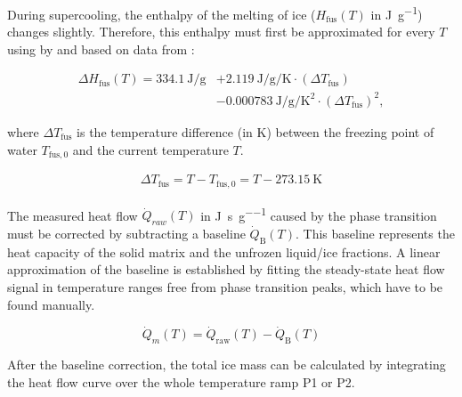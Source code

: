 
During supercooling, the enthalpy of the melting of ice ($H_\text{fus}(T)$ in \unit{\joule\per\gram}) changes slightly.
Therefore, this enthalpy must first be approximated for every $T$ using  by \textcite{chen.1988} and \textcite{ishikiriyama.1995} based on data from \textcite{randall.1930}:

\begin{equation}
	\begin{aligned}
		\Delta H_\text{fus}(T) = \qty{334.1}{\joule\per\gram} & + \qty{2.119}{\joule\per\gram\per\kelvin} \cdot ( \Delta T_\text{fus} ) \\
		& - \qty{0.000783}{\joule\per\gram\per\kelvin\squared} \cdot ( \Delta T_\text{fus} )^2 ,
	\end{aligned}
	\label{eq:ltdsc_h}
\end{equation}

where $\Delta T_\text{fus}$ is the temperature difference (in \unit{\kelvin}) between the freezing point of water $T_{\text{fus},0}$ and the current temperature $T$.

\begin{equation}
	\begin{aligned}
	\Delta T_\text{fus} = T - T_{\text{fus},0} = T - \qty{273.15}{\kelvin}
	\end{aligned}
\end{equation}

The measured heat flow $\dot{Q}_{raw}(T)$ in \unit{\joule\per\second\per\gram} caused by the phase transition must be corrected by subtracting a baseline $\dot{Q}_\text{B}(T)$.
This baseline represents the heat capacity of the solid matrix and the unfrozen liquid/ice fractions.
A linear approximation of the baseline is established by fitting the steady-state heat flow signal in temperature ranges free from phase transition peaks, which have to be found manually.

\begin{equation}
	\dot{Q}_{m}(T) = \dot{Q}_\text{raw}(T) -\dot{Q}_\text{B}(T)
	\label{eq:mass_heat_flow}
\end{equation}


After the baseline correction, the total ice mass can be calculated by integrating the heat flow curve over the whole temperature ramp P1 or P2.

